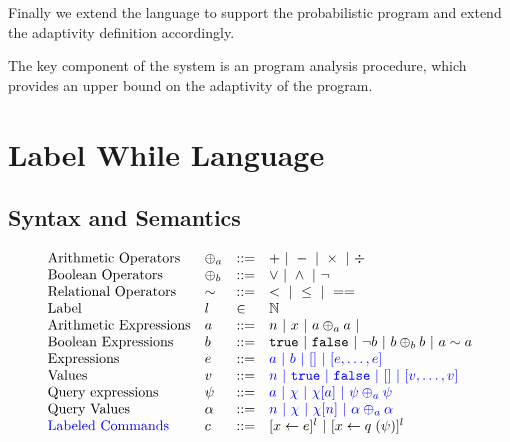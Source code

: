 \documentclass[a4paper,11pt]{article}
\begin{document}
Finally we extend the language to support the probabilistic program and extend the adaptivity definition accordingly.


The key component of the system is an program analysis procedure, which provides an upper bound on the adaptivity of the program.

\section{Label While Language}
\label{sec:while_language}
%
\subsection{Syntax and Semantics}
%
\[
\begin{array}{llll}
 \mbox{Arithmetic Operators} & \oplus_a & ::= & + ~|~ - ~|~ \times 
%
~|~ \div \\  
  \mbox{Boolean Operators} & \oplus_b & ::= & \lor ~|~ \land ~|~ \neg\\
   \mbox{Relational Operators} & \sim & ::= & < ~|~ \leq ~|~ == \\  
   \mbox{Label} & l & \in &  \mathbb{N}  \\  
\mbox{Arithmetic Expressions} & \aexpr & ::= & 
	n ~|~ x ~|~ \aexpr \oplus_a \aexpr ~|~ \\
\mbox{Boolean Expressions} & \bexpr & ::= & 
	\etrue ~|~ \efalse  ~|~ \neg \bexpr
	 ~|~ \bexpr \oplus_b \bexpr
	~|~ \aexpr \sim \aexpr \\
\mbox{Expressions } & \expr & ::= & \jl{\aexpr \sep \bexpr ~|~ [] ~|~ [\expr, \dots, \expr]} \\
\mbox{Values } & v & ::= & \jl{ n \sep \etrue \sep \efalse ~|~ [] ~|~ [v, \dots, v]}  
\\
\mbox{Query expressions} & \qexpr & ::= 
& \jl{ \aexpr ~|~ \chi ~|~ \chi[\aexpr] ~|~ \qexpr \oplus_a \qexpr} 
\\
\mbox{Query Values} & \qval & ::= 
& \jl{ n ~|~ \chi ~|~ \chi[n] ~|~ \qval \oplus_a  \qval }
\\
\mbox{\jl{Labeled Commands}} & c & ::= 
	&   [\assign x \expr]^{l} ~|~  [\assign x q(\qexpr)]^{l}
	\\

\end{array}\]
\end{document}
